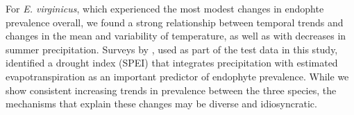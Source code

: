\documentclass[11pt]{article}
\begin{document}
For \emph{E. virginicus}, which experienced the most modest changes in endophte prevalence overall, we found a strong relationship between temporal trends and  changes in the mean and variability of temperature, as well as with decreases in summer precipitation.
Surveys by \citet{sneck2017variation}, used as part of the test data in this study, identified a drought index (SPEI) that integrates precipitation with estimated evapotranspiration as an important predictor of endophyte prevalence.
While we show consistent increasing trends in prevalence between the three species, the mechanisms that explain these changes may be diverse and idiosyncratic. 
\end{document}
